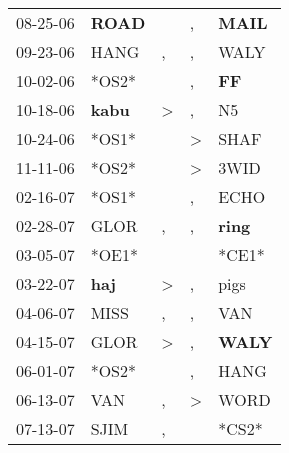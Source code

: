 \begin{supertabular}{p{0.07\textwidth}p{0.06\textwidth}p{0.02\textwidth}p{0.02\textwidth}p{0.06\textwidth}}
          08-25-06\textsuperscript{} &  \textbf{ROAD\textsuperscript{}} &                  &             , &  \textbf{MAIL\textsuperscript{}} \\
          09-23-06\textsuperscript{} &           HANG\textsuperscript{} &                , &             , &           WALY\textsuperscript{} \\
          10-02-06\textsuperscript{} &                            *OS2* &                  &             , &    \textbf{FF\textsuperscript{}} \\
          10-18-06\textsuperscript{} &  \textbf{kabu\textsuperscript{}} &     \textgreater &             , &             N5\textsuperscript{} \\
          10-24-06\textsuperscript{} &                            *OS1* &                  &  \textgreater &           SHAF\textsuperscript{} \\
          11-11-06\textsuperscript{} &                            *OS2* &                  &  \textgreater &           3WID\textsuperscript{} \\
          02-16-07\textsuperscript{} &                            *OS1* &                  &             , &           ECHO\textsuperscript{} \\
          02-28-07\textsuperscript{} &           GLOR\textsuperscript{} &                , &             , &  \textbf{ring\textsuperscript{}} \\
          03-05-07\textsuperscript{} &                            *OE1* &                  &               &                            *CE1* \\
          03-22-07\textsuperscript{} &   \textbf{haj\textsuperscript{}} &     \textgreater &             , &           pigs\textsuperscript{} \\
          04-06-07\textsuperscript{} &           MISS\textsuperscript{} &                , &             , &            VAN\textsuperscript{} \\
          04-15-07\textsuperscript{} &           GLOR\textsuperscript{} &     \textgreater &             , &  \textbf{WALY\textsuperscript{}} \\
          06-01-07\textsuperscript{} &                            *OS2* &                  &             , &           HANG\textsuperscript{} \\
          06-13-07\textsuperscript{} &            VAN\textsuperscript{} &                , &  \textgreater &           WORD\textsuperscript{} \\
          07-13-07\textsuperscript{} &           SJIM\textsuperscript{} &                , &               &                            *CS2* \\

\end{supertabular}
